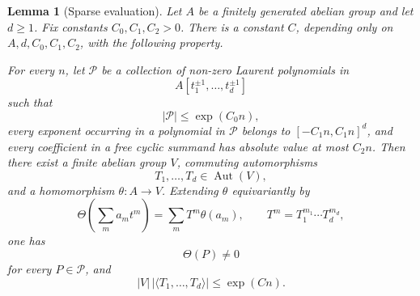 \documentclass[11pt]{article}
\newcommand{\Aut}{\operatorname{Aut}}
\newtheorem{lemma}[theorem]{Lemma}
\begin{document}
\begin{lemma}[Sparse evaluation]
Let \(A\) be a finitely generated abelian group and let \(d\ge 1\). Fix constants \(C_0,C_1,C_2>0\). There is a constant \(C\), depending only on \(A,d,C_0,C_1,C_2\), with the following property.

For every \(n\), let \(\mathcal P\) be a collection of non-zero Laurent polynomials in
\[
A[t_1^{\pm 1},\ldots,t_d^{\pm 1}]
\]
such that
\[
|\mathcal P|\le \exp(C_0n),
\]
every exponent occurring in a polynomial in \(\mathcal P\) belongs to \([-C_1n,C_1n]^d\), and every coefficient in a free cyclic summand has absolute value at most \(C_2n\). Then there exist a finite abelian group \(V\), commuting automorphisms
\[
T_1,\ldots,T_d\in\Aut(V),
\]
and a homomorphism \(\theta:A\to V\). Extending \(\theta\) equivariantly by
\[
\Theta\left(\sum_m a_m t^m\right)=\sum_m T^m\theta(a_m),\qquad T^m=T_1^{m_1}\cdots T_d^{m_d},
\]
one has
\[
\Theta(P)\neq 0
\]
for every \(P\in\mathcal P\), and
\[
|V|\,|\langle T_1,\ldots,T_d\rangle|\le \exp(Cn).
\]
\end{lemma}
\end{document}
